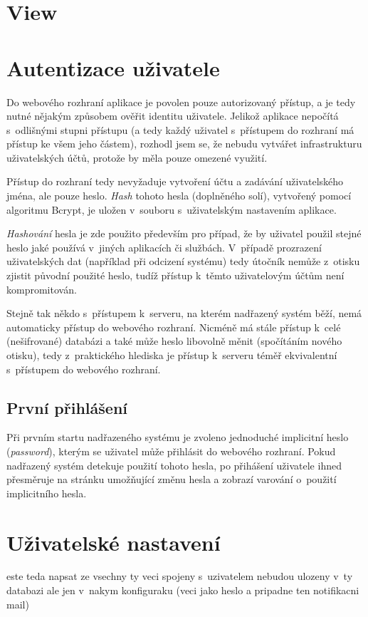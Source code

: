 \section{View}

\section{Autentizace uživatele}
\label{sec:de_auth}

Do webového rozhraní aplikace je povolen pouze autorizovaný přístup, a je tedy nutné nějakým způsobem ověřit identitu uživatele. Jelikož aplikace nepočítá s~odlišnými stupni přístupu (a tedy každý uživatel s~přístupem do rozhraní má přístup ke všem jeho částem), rozhodl jsem se, že nebudu vytvářet infrastrukturu uživatelských účtů, protože by měla pouze omezené využití.

Přístup do rozhraní tedy nevyžaduje vytvoření účtu a zadávání uživatelského jména, ale pouze heslo. \textit{Hash} tohoto hesla (doplněného solí), vytvořený pomocí algoritmu Bcrypt, je uložen v~souboru s~uživatelským nastavením aplikace.

\textit{Hashování} hesla je zde použito především pro případ, že by uživatel použil stejné heslo jaké používá v~jiných aplikacích či službách. V~případě prozrazení uživatelských dat (například při odcizení systému) tedy útočník nemůže z~otisku zjistit původní použité heslo, tudíž přístup k~těmto uživatelovým účtům není kompromitován.

Stejně tak někdo s~přístupem k~serveru, na kterém nadřazený systém běží, nemá automaticky přístup do webového rozhraní. Nicméně má stále přístup k~celé (nešifrované) databázi a také může heslo libovolně měnit (spočítáním nového otisku), tedy z~praktického hlediska je přístup k~serveru téměř ekvivalentní s~přístupem do webového rozhraní.

\subsection{První přihlášení}

Při prvním startu nadřazeného systému je zvoleno jednoduché implicitní heslo (\textit{password}), kterým se uživatel může přihlásit do webového rozhraní. Pokud nadřazený systém detekuje použití tohoto hesla, po přihášení uživatele ihned přesměruje na stránku umožňující změnu hesla a zobrazí varování o~použití implicitního hesla.

\section{Uživatelské nastavení}

este teda napsat ze vsechny ty veci spojeny s~uzivatelem nebudou ulozeny v~ty databazi ale jen v~nakym konfiguraku (veci jako heslo a pripadne ten notifikacni mail)
